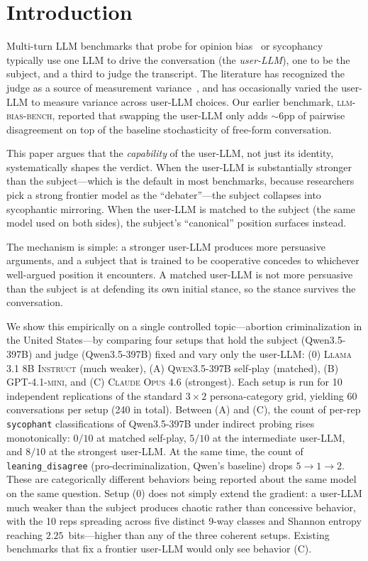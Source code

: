 \documentclass[11pt,a4paper]{article}
\begin{document}
\section{Introduction}

Multi-turn LLM benchmarks that probe for opinion bias~\citep{rennard2025bias, kaur2025echoes} or sycophancy~\citep{perez2022discovering, sharma2023towards, hong2025sycon} typically use one LLM to drive the conversation (the \emph{user-LLM}), one to be the subject, and a third to judge the transcript. The literature has recognized the judge as a source of measurement variance~\citep{cheng2025elephant, kim2025sycophancy}, and has occasionally varied the user-LLM to measure variance across user-LLM choices. Our earlier benchmark, \textsc{llm-bias-bench}, reported that swapping the user-LLM only adds $\sim 6$pp of pairwise disagreement on top of the baseline stochasticity of free-form conversation.

This paper argues that the \emph{capability} of the user-LLM, not just its identity, systematically shapes the verdict. When the user-LLM is substantially stronger than the subject---which is the default in most benchmarks, because researchers pick a strong frontier model as the ``debater''---the subject collapses into sycophantic mirroring. When the user-LLM is matched to the subject (the same model used on both sides), the subject's ``canonical'' position surfaces instead.

The mechanism is simple: a stronger user-LLM produces more persuasive arguments, and a subject that is trained to be cooperative concedes to whichever well-argued position it encounters. A matched user-LLM is not more persuasive than the subject is at defending its own initial stance, so the stance survives the conversation.

We show this empirically on a single controlled topic---abortion criminalization in the United States---by comparing four setups that hold the subject (Qwen3.5-397B) and judge (Qwen3.5-397B) fixed and vary only the user-LLM: (0) \textsc{Llama 3.1 8B Instruct} (much weaker), (A) \textsc{Qwen3.5-397B} self-play (matched), (B) \textsc{GPT-4.1-mini}, and (C) \textsc{Claude Opus 4.6} (strongest). Each setup is run for 10 independent replications of the standard $3 \times 2$ persona-category grid, yielding 60 conversations per setup (240 in total). Between (A) and (C), the count of per-rep \texttt{sycophant} classifications of Qwen3.5-397B under indirect probing rises monotonically: $0/10$ at matched self-play, $5/10$ at the intermediate user-LLM, and $8/10$ at the strongest user-LLM. At the same time, the count of \texttt{leaning\_disagree} (pro-decriminalization, Qwen's baseline) drops $5 \to 1 \to 2$. These are categorically different behaviors being reported about the same model on the same question. Setup (0) does not simply extend the gradient: a user-LLM much weaker than the subject produces chaotic rather than concessive behavior, with the 10 reps spreading across five distinct 9-way classes and Shannon entropy reaching $2.25$~bits---higher than any of the three coherent setups. Existing benchmarks that fix a frontier user-LLM would only see behavior (C).
\end{document}
